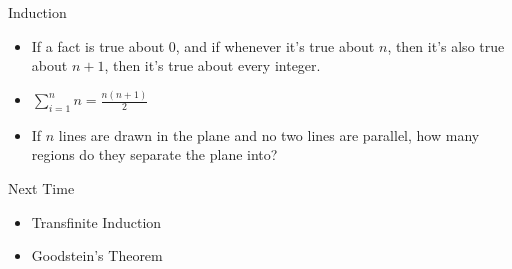 \documentclass{beamer}
\begin{document}
\begin{frame}{Induction}
\begin{itemize}
\item If a fact is true about 0, and if whenever it's true about $n$, then it's also true about $n+1$, then it's true about every integer.
\item $\sum_{i=1}^n n = \frac{n(n+1)}{2}$
\item If $n$ lines are drawn in the plane and no two lines are parallel, how many regions do they separate the plane into?
\end{itemize}
\end{frame}

\begin{frame}{Next Time}
\begin{itemize}
\item Transfinite Induction
\item Goodstein's Theorem
\end{itemize}
\end{frame}
\end{document}
